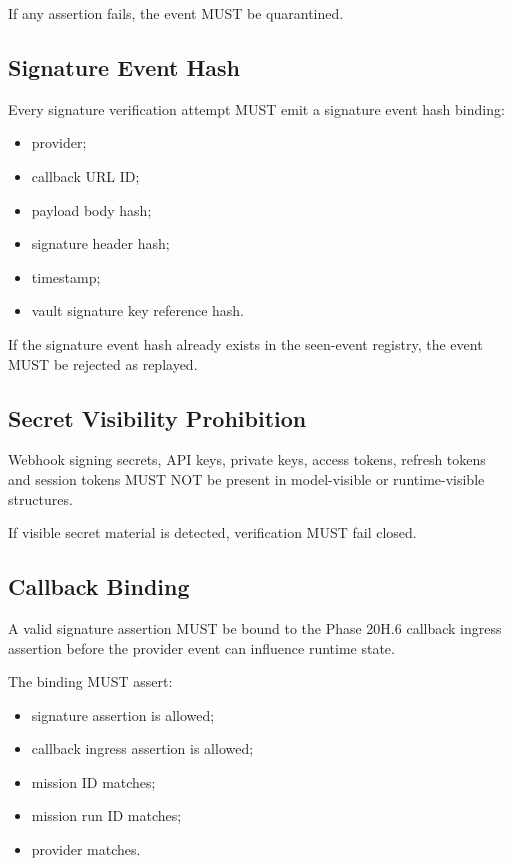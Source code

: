 If any assertion fails, the event MUST be quarantined.

\subsection{Signature Event Hash}

Every signature verification attempt MUST emit a signature event hash binding:

\begin{itemize}
  \item provider;
  \item callback URL ID;
  \item payload body hash;
  \item signature header hash;
  \item timestamp;
  \item vault signature key reference hash.
\end{itemize}

If the signature event hash already exists in the seen-event registry, the event MUST be rejected as replayed.

\subsection{Secret Visibility Prohibition}

Webhook signing secrets, API keys, private keys, access tokens, refresh tokens and session tokens MUST NOT be present in model-visible or runtime-visible structures.

If visible secret material is detected, verification MUST fail closed.

\subsection{Callback Binding}

A valid signature assertion MUST be bound to the Phase 20H.6 callback ingress assertion before the provider event can influence runtime state.

The binding MUST assert:

\begin{itemize}
  \item signature assertion is allowed;
  \item callback ingress assertion is allowed;
  \item mission ID matches;
  \item mission run ID matches;
  \item provider matches.
\end{itemize}

